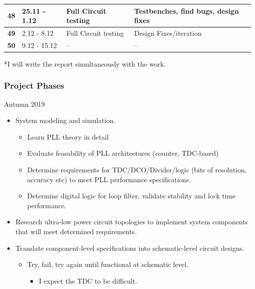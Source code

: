 \documentclass[t, screen, aspectratio=43]{beamer}
\begin{document}
\begin{frame}
\begin{table}[htb!]
\begin{tabular}{|l|l|l|l|}
			\hline 
			\rule[-1ex]{0pt}{2.5ex} \textbf{48}& 25.11 - 1.12& Full Circuit testing & Testbenches, find bugs, design fixes\\ 
			\hline 
			\rule[-1ex]{0pt}{2.5ex} \textbf{49}& 2.12 - 8.12& Full Circuit testing& Design Fixes/iteration\\ 
			\hline 
			\rule[-1ex]{0pt}{2.5ex} \textbf{50}& 9.12 - 15.12& --& --\\ 
			\hline 
		\end{tabular}
		\begin{flushleft}*I will write the report simultaneously with the work.
		\end{flushleft}
	\end{table}   
\end{frame}


\begin{frame}
	\frametitle{Project Phases}
	\begin{block}{Autumn 2019}
		\footnotesize
		\begin{itemize}
			\item System modeling and simulation.
			\begin{itemize}
				\footnotesize
				\item Learn PLL theory in detail
				\item Evaluate feasability of PLL architectures (counter, TDC-based)
				\item Determine requirements for TDC/DCO/Divider/logic (bits of resolution, accuracy etc) to meet PLL performance specifications.
				\item Determine digital logic for loop filter, validate stability and lock time performance.
			\end{itemize}
			\item Research ultra-low power circuit topologies to implement system components that will meet determined requirements.
			\item Translate component-level specifications into schematic-level circuit designs.
			\begin{itemize}
				\footnotesize
				\item Try, fail, try again until functional at schematic level.
				\begin{itemize}
					\footnotesize
					\item I expect the TDC to be difficult.
				\end{itemize}
			\end{itemize}      
		\end{itemize}
	\end{block}
\end{frame}
\end{document}

